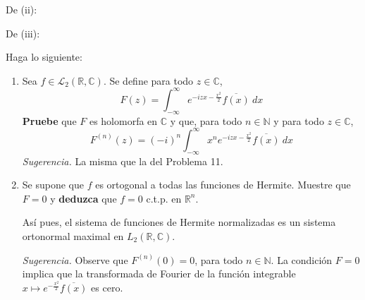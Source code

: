 \documentclass[12pt]{report}
\theoremstyle{largebreak}
\newcommand\conj[1]{\ensuremath{\overline{#1}}}
\begin{document}
\begin{sol}
        De (ii): %

        De (iii): 
    \end{sol}

    \begin{excer}
        Haga lo siguiente:
        \begin{enumerate}
            \item Sea $f\in\mathcal{L}_2(\mathbb{R},\mathbb{C})$. Se define para todo $z\in\mathbb{C}$,
            \begin{equation*}
                F(z)=\int_{-\infty}^{\infty}e^{ -izx-\frac{x^2}{2}}\conj{f(x)}\:dx
            \end{equation*}
            \textbf{Pruebe} que $F$ es holomorfa en $\mathbb{C}$ y que, para todo $n\in\mathbb{N}$ y para todo $z\in\mathbb{C}$,
            \begin{equation*}
                F^{(n)}(z)=(-i)^n\int_{-\infty}^\infty x^ne^{ -izx-\frac{x^2}{2}}\conj{f(x)}\:dx
            \end{equation*}
            \textit{Sugerencia.} La misma que la del Problema 11.
            \item Se supone que $f$ es ortogonal a todas las funciones de Hermite. Muestre que $F=0$ y \textbf{deduzca} que $f=0$ c.t.p. en $\mathbb{R}^n$.
            
            Así pues, el sistema de funciones de Hermite normalizadas es un sistema ortonormal maximal en $L_2(\mathbb{R},\mathbb{C})$.

            \textit{Sugerencia.} Observe que $F^{(n)}(0)=0$, para todo $n\in\mathbb{N}$. La condición $F=0$ implica que la transformada de Fourier de la función integrable $x\mapsto e^{ -\frac{x^2}{2}}\conj{f(x)}$ es cero.
        \end{enumerate}
    \end{excer}
\end{document}
